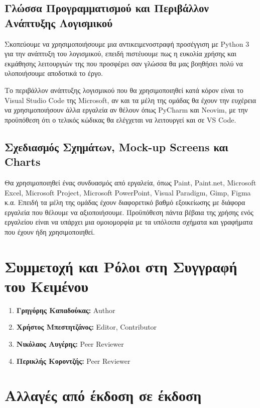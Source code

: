 \documentclass[12pt,a4paper]{article}
\begin{document}
\subsection{Γλώσσα Προγραμματισμού και Περιβάλλον Ανάπτυξης Λογισμικού}
Σκοπεύουμε να χρησιμοποιήσουμε μια αντικειμενοστραφή προσέγγιση με Python 3 για την ανάπτυξη του λογισμικού, επειδή πιστέυουμε πως η ευκολία χρήσης και εκμάθησης λειτουργιών της που προσφέρει σαν γλώσσα θα μας βοηθήσει πολύ να υλοποιήσουμε αποδοτικά το έργο.

Το περιβάλλον ανάπτυξης λογισμικού που θα χρησιμοποιηθεί κατά κόρον είναι το Visual Studio Code της Microsoft, αν και τα μέλη της ομάδας θα έχουν την ευχέρεια να χρησιμοποιήσουν άλλα εργαλεία αν θέλουν όπως PyCharm και Neovim, με την προϋπόθεση ότι ο τελικός κώδικας θα ελέγχεται να λειτουργεί και σε VS Code.

\subsection{Σχεδιασμός Σχημάτων, Mock-up Screens και Charts}
Θα χρησιμοποιηθεί ένας συνδυασμός από εργαλεία, όπως Paint, Paint.net, Microsoft Excel, Microsoft Project, Microsoft PowerPoint, Visual Paradigm, Gimp, Figma κ.α. Επειδή τα μέλη της ομάδας έχουν διαφορετικό βαθμό εξοικείωσης με διάφορα εργαλεία που θέλουμε να αξιοποιήσουμε. Προϋπόθεση πάντα βέβαια της χρήσης ενός εργαλείου είναι να υπάρχει μια ομοιομορφία με τα υπόλοιπα σχήματα και γραφήματα που έχουν ήδη χρησιμοποιηθεί.

\section{Συμμετοχή και Ρόλοι στη Συγγραφή του Κειμένου}
\begin{enumerate}
	\item \textbf{Γρηγόρης Καπαδούκας:} Author
	\item \textbf{Χρήστος Μπεστητζάνος:} Editor, Contributor
	\item \textbf{Νικόλαος Αυγέρης:} Peer Reviewer
	\item \textbf{Περικλής Κοροντζής:} Peer Reviewer
\end{enumerate}

\section{Αλλαγές από έκδοση σε έκδοση}
\end{document}
